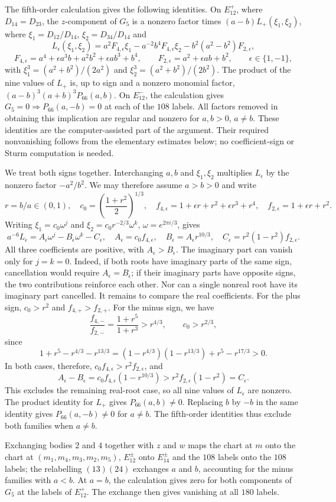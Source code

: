 \documentclass[11pt]{amsart}
\theoremstyle{definition}
\theoremstyle{remark}
\begin{document}
{The fifth-order calculation gives the following identities. On $E^+_{12}$,
where $D_{14}=D_{23}$, the $z$-component of $G_5$ is a nonzero factor times
$(a-b)L_+(\xi_1,\xi_2)$, where $\xi_1=D_{12}/D_{14}$,
$\xi_2=D_{34}/D_{14}$ and
\[
 L_\epsilon(\xi_1,\xi_2)
 =a^2F_{4,\epsilon}\xi_1-a^{-2}b^4F_{4,\epsilon}\xi_2
       -b^2(a^2-b^2)F_{2,\epsilon},
\]
\[
 F_{4,\epsilon}=a^4+\epsilon a^3b+a^2b^2+\epsilon ab^3+b^4,
 \qquad F_{2,\epsilon}=a^2+\epsilon ab+b^2,
 \qquad \epsilon\in\{1,-1\},
\]
with $\xi_1^3=(a^2+b^2)/(2a^2)$ and
$\xi_2^3=(a^2+b^2)/(2b^2)$.
The product of the nine values of $L_+$ is, up to sign and a nonzero monomial
factor, $(a-b)^3(a+b)^3P_{66}(a,b)$.
On $E^-_{12}$, the calculation gives $G_5=0\Rightarrow P_{66}(a,-b)=0$
at each of the $108$ labels. All factors removed in obtaining this implication
are regular and nonzero for $a,b>0$, $a\ne b$.
These identities are the computer-assisted part of the argument.
Their required nonvanishing follows from the elementary estimates below;
no coefficient-sign or Sturm computation is needed.

We treat both signs together. Interchanging $a,b$ and $\xi_1,\xi_2$ multiplies $L_\epsilon$
by the nonzero factor $-a^2/b^2$. We may therefore assume $a>b>0$ and write
\[
 r=b/a\in(0,1),\quad c_0=\left(\frac{1+r^2}{2}\right)^{1/3},\quad
 f_{4,\epsilon}=1+\epsilon r+r^2+\epsilon r^3+r^4,\quad
 f_{2,\epsilon}=1+\epsilon r+r^2.
\]
Writing $\xi_1=c_0\omega^j$ and $\xi_2=c_0r^{-2/3}\omega^k$,
$\omega=e^{2\pi i/3}$, gives
\[
 a^{-6}L_\epsilon=A_\epsilon\omega^j-B_\epsilon\omega^k-C_\epsilon,
 \quad A_\epsilon=c_0f_{4,\epsilon},\quad
 B_\epsilon=A_\epsilon r^{10/3},\quad
 C_\epsilon=r^2(1-r^2)f_{2,\epsilon}.
\]
All three coefficients are positive, with $A_\epsilon>B_\epsilon$.
The imaginary part can vanish only for $j=k=0$.
Indeed, if both roots have imaginary parts of the same sign, cancellation would require
$A_\epsilon=B_\epsilon$; if their imaginary parts have opposite signs, the two contributions
reinforce each other. Nor can a single nonreal root have its imaginary part cancelled.
It remains to compare the real coefficients. For the plus sign, $c_0>r^2$ and
$f_{4,+}>f_{2,+}$. For the minus sign, we have
\[
 \frac{f_{4,-}}{f_{2,-}}=\frac{1+r^5}{1+r^3}>r^{4/3},\qquad c_0>r^{2/3},
\]
since
\[
 1+r^5-r^{4/3}-r^{13/3}
 =(1-r^{4/3})(1-r^{13/3})+r^5-r^{17/3}>0.
\]
In both cases, therefore, $c_0f_{4,\epsilon}>r^2f_{2,\epsilon}$, and
\[
 A_\epsilon-B_\epsilon
 =c_0f_{4,\epsilon}(1-r^{10/3})
 >r^2f_{2,\epsilon}(1-r^2)=C_\epsilon.
\]
This excludes the remaining real-root case, so all nine values of $L_\epsilon$ are nonzero.
The product identity for $L_+$ gives $P_{66}(a,b)\ne0$.
Replacing $b$ by $-b$ in the same identity gives $P_{66}(a,-b)\ne0$ for $a\ne b$.
The fifth-order identities thus exclude both families when $a\ne b$.

}
{Exchanging bodies $2$ and $4$ together with $z$ and
$w$ maps the chart at $m$ onto the chart at $(m_1,m_4,m_3,m_2,m_5)$, $E^\pm_{12}$ onto
$E^\pm_{14}$ and the $108$ labels onto the $108$ labels; the relabelling $(13)(24)$ exchanges $a$
and $b$, accounting for the minus families with $a<b$.
At $a=b$, the calculation gives zero for both components of $G_5$ at the labels of $E^+_{12}$.
The exchange then gives vanishing at all $180$ labels.}
\end{document}
